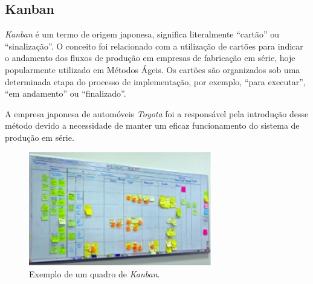 \subsection{Kanban}
\par \emph{Kanban} é um termo de origem japonesa, significa literalmente ``cartão'' ou ``sinalização''. O conceito foi relacionado com a utilização de cartões para indicar o andamento dos fluxos de produção em empresas de fabricação em série, hoje popularmente utilizado em Métodos Ágeis. Os cartões são organizados sob uma determinada etapa do processo de implementação, por exemplo, ``para executar'', ``em andamento'' ou ``finalizado''.
\par A empresa japonesa de automóveis \emph{Toyota} foi a responsável pela introdução desse método devido a necessidade de manter um eficaz funcionamento do sistema de produção em série.
\begin{figure}[!htb]
\centering
\includegraphics[width=8cm]{figuras/kanban_exemplo}
\caption{\label{fig:kanban_exemplo}Exemplo de um quadro de \emph{Kanban}.}
\end{figure}

